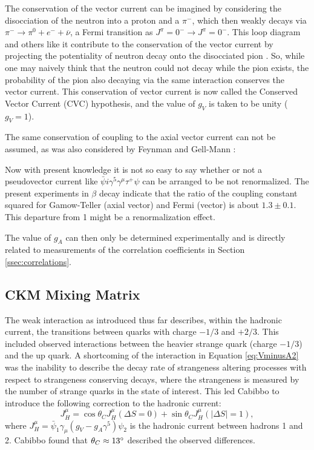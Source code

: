 The conservation of the vector current can be imagined by considering the disocciation of the neutron
into a proton and a $\pi^{-}$, which then weakly decays via $\pi^- \rightarrow \pi^0+e^- + \overline{\nu}$,
a Fermi transition as $J^\pi=0^- \rightarrow J^\pi=0^-$. This loop diagram and others like it contribute to the
conservation of the vector current by projecting
the potentiality of neutron decay onto the disocciated pion \cite{grotz1990}. So, while one may naively
think that the neutron could not decay while the pion exists, the probability of the pion also decaying
via the same interaction conserves the vector current.
This conservation of vector current is now called the
Conserved Vector Current (CVC) hypothesis, and the value of $g_V$ is taken to be unity ($g_V = 1$).

The same conservation of coupling to the axial vector current can not be assumed, as was also 
considered by Feynman and Gell-Mann \cite{feynman1958}:
%
\begin{displayquote}
Now with present knowledge it is not so easy to say
whether or not a pseudovector current like
$\bar{\psi}i\gamma^5\gamma^\mu\tau^+\psi$
can be arranged to be not renormalized. The present
experiments in $\beta$ decay indicate that the ratio of the
coupling constant squared for Gamow-Teller (axial vector) and Fermi
(vector)
is about $1.3\pm0.1$. This departure from 1 might be a
renormalization effect.
\end{displayquote}
%
The value of $g_A$ can then only be determined experimentally and is directly related to measurements
of the correlation coefficients in Section \ref{ssec:correlations}.


\subsection{CKM Mixing Matrix}
The weak interaction as introduced thus far describes, within the hadronic current, the transitions
between quarks with charge $-1/3$ and $+2/3$. This included observed interactions between the heavier
strange quark (charge $-1/3$) and the up quark. 
A shortcoming of the interaction in Equation \ref{eq:VminusA2} was the inability to describe
the decay rate of strangeness altering processes with respect to strangeness conserving
decays, where the strangeness is measured by the number of strange quarks in the state of interest.
This led Cabibbo \cite{cabibbo1963} to introduce the following correction to the hadronic current:
%
\begin{equation}
  J^\mu_H = \cos\theta_C J^\mu_H(\Delta S=0) + \sin\theta_C J^\mu_H(|\Delta S|=1),
  \label{eq:cabibbo}
\end{equation}
%
where $J^\mu_H = \bar{\psi}_1 \gamma_\mu(g_V-g_A\gamma^5)\psi_2$ is the hadronic current between
hadrons 1 and 2. Cabibbo found that $\theta_C \approx 13\degree$ described the observed differences.

